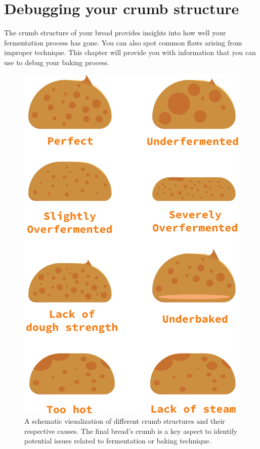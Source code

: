 \section{Debugging your crumb structure}%
\label{section:debugging-crumb-structure}

The crumb structure of your bread provides insights into how well
your fermentation process has gone. You can also spot common flaws
arising from improper technique. This chapter will provide you with information
that you can use to debug your baking process.

\begin{figure}
  \includegraphics[width=\textwidth]{crumb-structures-book}
  \caption{A schematic visualization of different crumb structures and their respective causes. The
  final bread's crumb is a key aspect to identify potential issues related to fermentation
  or baking technique.}%
  \label{fig:crumb-structures-book}
\end{figure}

